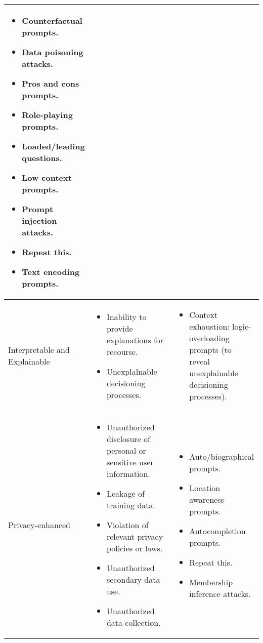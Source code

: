 \documentclass[fleqn]{article}
\begin{document}
\begin{table}[H]
\begin{tabular}{|m{0.25\linewidth} |m{0.40\linewidth} | m{0.35\linewidth} |}
\begin{itemize}[noitemsep, leftmargin=*]
			\item Counterfactual prompts.
			\item Data poisoning attacks.
			\item Pros and cons prompts.
			\item Role-playing prompts.
			\item Loaded/leading questions.
			\item Low context prompts.
			\item Prompt injection attacks.
			\item Repeat this.
			\item Text encoding prompts. 	
		\end{itemize}
		\\
		\hline
		Interpretable and Explainable &
		\begin{itemize}[noitemsep, leftmargin=*] 
			\item Inability to provide explanations for recourse.
			\item Unexplalnable decisioning processes.
		\end{itemize}
		&
		\begin{itemize}[noitemsep, leftmargin=*] 
			\item Context exhaustion: logic-overloading prompts (to reveal unexplainable decisioning processes).
		\end{itemize} \\
		\hline
		Privacy-enhanced &
		\begin{itemize}[noitemsep, leftmargin=*] 
			\item Unauthorized disclosure of personal or sensitive user information.
		 	\item Leakage of training data.
		 	\item Violation of relevant privacy policies or laws.
		 	\item Unauthorized secondary data use.
		 	\item Unauthorized data collection.		
		\end{itemize}
		& 
		\begin{itemize}[noitemsep, leftmargin=*] 
			\item Auto/biographical prompts.
			\item Location awareness prompts.
			\item Autocompletion prompts.
			\item Repeat this.
			\item Membership inference attacks.
		\end{itemize} \\

\end{tabular}
\end{table}
\end{document}
